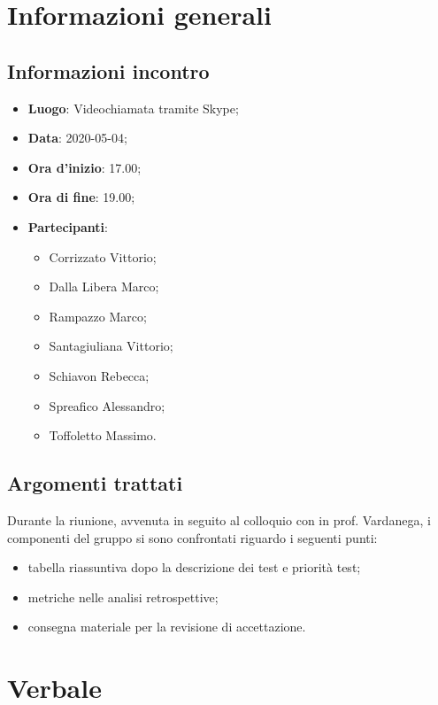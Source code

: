 \section{Informazioni generali}
    \subsection{Informazioni incontro}
        \begin{itemize}
            \item \textbf{Luogo}: Videochiamata tramite Skype;
            \item \textbf{Data}: 2020-05-04;
            \item \textbf{Ora d'inizio}: 17.00;
            \item \textbf{Ora di fine}: 19.00;
            \item \textbf{Partecipanti}: 
            \begin{itemize}
                \item Corrizzato Vittorio;
                \item Dalla Libera Marco;
                \item Rampazzo Marco;
                \item Santagiuliana Vittorio;
                \item Schiavon Rebecca;
                \item Spreafico Alessandro;
                \item Toffoletto Massimo.
            \end{itemize}
        \end{itemize}
    \subsection{Argomenti trattati}
        Durante la riunione, avvenuta in seguito al colloquio con in prof. Vardanega, i componenti del gruppo si sono confrontati riguardo i seguenti punti:
		\begin{itemize}
			\item tabella riassuntiva dopo la descrizione dei test e priorità test;
			\item metriche nelle analisi retrospettive;
			\item consegna materiale per la revisione di accettazione.
		\end{itemize}
\section{Verbale}
